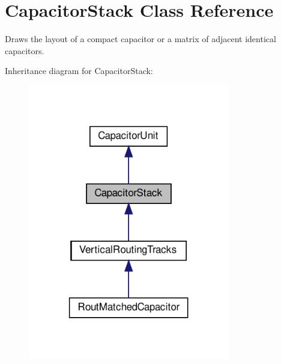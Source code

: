 \hypertarget{classpython_1_1capacitormatrix_1_1CapacitorStack}{}\section{Capacitor\+Stack Class Reference}
\label{classpython_1_1capacitormatrix_1_1CapacitorStack}


Draws the layout of a compact capacitor or a matrix of adjacent identical capacitors.  




Inheritance diagram for Capacitor\+Stack\+:\nopagebreak
\begin{figure}[H]
\begin{center}
\leavevmode
\includegraphics[width=250pt]{classpython_1_1capacitormatrix_1_1CapacitorStack__inherit__graph}
\end{center}
\end{figure}
